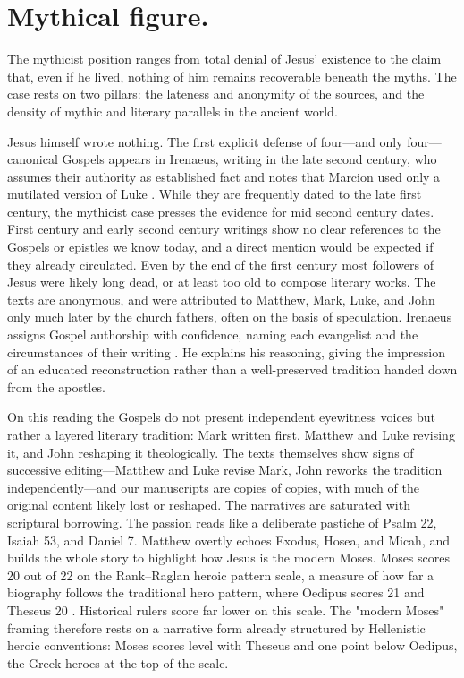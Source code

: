 \section{Mythical figure.}\label{sec:mythical}

The mythicist position ranges from total denial of Jesus’ existence to the claim that, even if he lived, nothing of him remains recoverable beneath the myths.
The case rests on two pillars: the lateness and anonymity of the sources, and the density of mythic and literary parallels in the ancient world.

Jesus himself wrote nothing.
The first explicit defense of four---and only four---canonical Gospels appears in Irenaeus, writing in the late second century, who assumes their authority as established fact and notes that Marcion used only a mutilated version of Luke \cite[3.11.7]{irenaeus:advhaer}.
While they are frequently dated to the late first century, the mythicist case presses the evidence for mid second century dates.
First century and early second century writings show no clear references to the Gospels or epistles we know today, and a direct mention would be expected if they already circulated.
Even by the end of the first century most followers of Jesus were likely long dead, or at least too old to compose literary works.
The texts are anonymous, and were attributed to Matthew, Mark, Luke, and John only much later by the church fathers, often on the basis of speculation.
Irenaeus assigns Gospel authorship with confidence, naming each evangelist and the circumstances of their writing \cite[3.1.1]{irenaeus:advhaer}.
He explains his reasoning, giving the impression of an educated reconstruction rather than a well-preserved tradition handed down from the apostles.

On this reading the Gospels do not present independent eyewitness voices but rather a layered literary tradition: Mark written first, Matthew and Luke revising it, and John reshaping it theologically.
The texts themselves show signs of successive editing---Matthew and Luke revise Mark, John reworks the tradition independently---and our manuscripts are copies of copies, with much of the original content likely lost or reshaped.
The narratives are saturated with scriptural borrowing.
The passion reads like a deliberate pastiche of Psalm 22, Isaiah 53, and Daniel 7.
Matthew overtly echoes Exodus, Hosea, and Micah, and builds the whole story to highlight how Jesus is the modern Moses.
Moses scores 20 out of 22 on the Rank--Raglan heroic pattern scale, a measure of how far a biography follows the traditional hero pattern, where Oedipus scores 21 and Theseus 20 \cite{raglan:hero}.
Historical rulers score far lower on this scale.
The "modern Moses" framing therefore rests on a narrative form already structured by Hellenistic heroic conventions: Moses scores level with Theseus and one point below Oedipus, the Greek heroes at the top of the scale.

